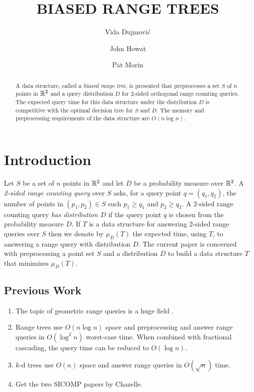 \documentclass[lotsofwhite,charterfonts]{patmorin}
\title{\MakeUppercase{Biased Range Trees}}
\author{Vida Dujmovi\'c
	\and John Howat
	\and Pat Morin}
\begin{document}
\maketitle
\begin{abstract}
A data structure, called a \emph{biased range tree}, 
is presented that preprocesses a set $S$ of $n$ points in $\mathbb{R}^2$
and a query distribution $D$ for 2-sided orthogonal range counting
queries.  The expected query time for this data structure under the
distribution $D$ is competitive with the optimal decision tree for $S$
and $D$.   The memory and preprocessing requirements of the data
structure are $O(n\log n)$.
\end{abstract}

\section{Introduction}

Let $S$ be a set of $n$ points in $\mathbb{R}^2$ and let $D$ be a probability
measure over $\mathbb{R}^2$.  A \emph{2-sided range counting query} over $S$
asks, for a query point $q=(q_1,q_2)$, the number of points in
$(p_1,p_2)\in S$ such $p_1 \ge q_1$ and $p_2 \ge q_2$.  A 2-sided
range counting query \emph{has distribution $D$} if the query point
$q$ is chosen from the probability measure $D$.  If $T$ is a data
structure for answering 2-sided range queries over $S$ then we denote
by $\mu_D(T)$ the expected time, using $T$, to answering a range query
with distribution $D$.  The current paper is concerned with
preprocessing a point set $S$ and a distribution $D$ to build a data
structure $T$ that minimizes $\mu_D(T)$.

\subsection{Previous Work}

\begin{enumerate}

\item The topic of geometric range queries is a huge field
\cite{agarwal_erickson}.

\item Range trees \cite{bentley} use $O(n\log n)$ space and
preprocessing and answer range queries in $O(\log^2 n)$
worst-case time.  When combined with fractional cascading, the query
time can be reduced to $O(\log n)$.

\item $k$-d trees use $O(n)$ space and answer range queries in
$O(\sqrt{n})$ time.

\item Get the two SICOMP papers by Chazelle.
\end{enumerate}
\end{document}
